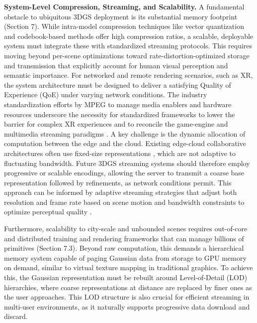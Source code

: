 \documentclass[11pt]{article}
\begin{document}
\textbf{System-Level Compression, Streaming, and Scalability.} A fundamental obstacle to ubiquitous 3DGS deployment is its substantial memory footprint (Section 7). While intra-model compression techniques like vector quantization and codebook-based methods offer high compression ratios, a scalable, deployable system must integrate these with standardized streaming protocols. This requires moving beyond per-scene optimizations toward rate-distortion-optimized storage and transmission that explicitly account for human visual perception and semantic importance. For networked and remote rendering scenarios, such as XR, the system architecture must be designed to deliver a satisfying Quality of Experience (QoE) under varying network conditions. The industry standardization efforts by MPEG to manage media enablers and hardware resources underscore the necessity for standardized frameworks to lower the barrier for complex XR experiences \cite{ref780} and to reconcile the game-engine and multimedia streaming paradigms \cite{ref781}. A key challenge is the dynamic allocation of computation between the edge and the cloud. Existing edge-cloud collaborative architectures often use fixed-size representations \cite{ref782}, which are not adaptive to fluctuating bandwidth. Future 3DGS streaming systems should therefore employ progressive or scalable encodings, allowing the server to transmit a coarse base representation followed by refinements, as network conditions permit. This approach can be informed by adaptive streaming strategies that adjust both resolution and frame rate based on scene motion and bandwidth constraints to optimize perceptual quality \cite{ref488}.

Furthermore, scalability to city-scale and unbounded scenes requires out-of-core and distributed training and rendering frameworks that can manage billions of primitives (Section 7.3). Beyond raw computation, this demands a hierarchical memory system capable of paging Gaussian data from storage to GPU memory on demand, similar to virtual texture mapping in traditional graphics. To achieve this, the Gaussian representation must be rebuilt around Level-of-Detail (LOD) hierarchies, where coarse representations at distance are replaced by finer ones as the user approaches. This LOD structure is also crucial for efficient streaming in multi-user environments, as it naturally supports progressive data download and discard.
\end{document}
